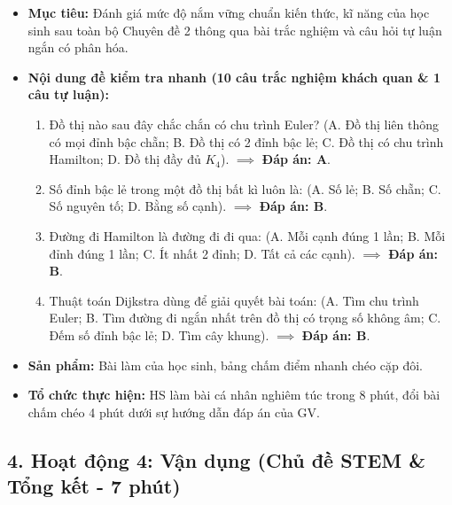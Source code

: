 \documentclass[12pt, a4paper]{article}
\begin{document}
\begin{itemize}[leftmargin=1.2cm]
    \item[a)] \textbf{Mục tiêu:} Đánh giá mức độ nắm vững chuẩn kiến thức, kĩ năng của học sinh sau toàn bộ Chuyên đề 2 thông qua bài trắc nghiệm và câu hỏi tự luận ngắn có phân hóa.
    \item[b)] \textbf{Nội dung đề kiểm tra nhanh (10 câu trắc nghiệm khách quan & 1 câu tự luận):}
    \begin{enumerate}[leftmargin=0.6cm]
        \item Đồ thị nào sau đây chắc chắn có chu trình Euler? (A. Đồ thị liên thông có mọi đỉnh bậc chẵn; B. Đồ thị có 2 đỉnh bậc lẻ; C. Đồ thị có chu trình Hamilton; D. Đồ thị đầy đủ $K_4$). $\implies$ \textbf{Đáp án: A}.
        \item Số đỉnh bậc lẻ trong một đồ thị bất kì luôn là: (A. Số lẻ; B. Số chẵn; C. Số nguyên tố; D. Bằng số cạnh). $\implies$ \textbf{Đáp án: B}.
        \item Đường đi Hamilton là đường đi đi qua: (A. Mỗi cạnh đúng 1 lần; B. Mỗi đỉnh đúng 1 lần; C. Ít nhất 2 đỉnh; D. Tất cả các cạnh). $\implies$ \textbf{Đáp án: B}.
        \item Thuật toán Dijkstra dùng để giải quyết bài toán: (A. Tìm chu trình Euler; B. Tìm đường đi ngắn nhất trên đồ thị có trọng số không âm; C. Đếm số đỉnh bậc lẻ; D. Tìm cây khung). $\implies$ \textbf{Đáp án: B}.
    \end{enumerate}
    \item[c)] \textbf{Sản phẩm:} Bài làm của học sinh, bảng chấm điểm nhanh chéo cặp đôi.
    \item[d)] \textbf{Tổ chức thực hiện:} HS làm bài cá nhân nghiêm túc trong 8 phút, đổi bài chấm chéo 4 phút dưới sự hướng dẫn đáp án của GV.
\end{itemize}

\subsection*{4. Hoạt động 4: Vận dụng (Chủ đề STEM & Tổng kết - 7 phút)}
\end{document}
